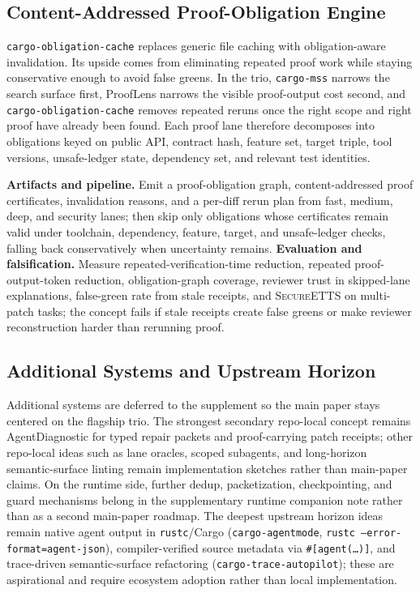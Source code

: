 \documentclass[conference]{IEEEtran}
\newcommand{\concepttag}[1]{%
  \noindent{\small\ttfamily #1}\par\vspace{2pt}%
}
\newcommand{\secureetts}{\textnormal{\textsc{SecureETTS}}}
\begin{document}
\subsection{Content-Addressed Proof-Obligation Engine}
\label{sub:obligationcache}
\concepttag{cargo-obligation-cache}
\texttt{cargo-obligation-cache} replaces generic file caching with obligation-aware invalidation. Its upside comes from eliminating repeated proof work while staying conservative enough to avoid false greens. In the trio, \texttt{cargo-mss} narrows the search surface first, ProofLens narrows the visible proof-output cost second, and \texttt{cargo-obligation-cache} removes repeated reruns once the right scope and right proof have already been found. Each proof lane therefore decomposes into obligations keyed on public API, contract hash, feature set, target triple, tool versions, unsafe-ledger state, dependency set, and relevant test identities.

\textbf{Artifacts and pipeline.} Emit a proof-obligation graph, content-addressed proof certificates, invalidation reasons, and a per-diff rerun plan from fast, medium, deep, and security lanes; then skip only obligations whose certificates remain valid under toolchain, dependency, feature, target, and unsafe-ledger checks, falling back conservatively when uncertainty remains. \textbf{Evaluation and falsification.} Measure repeated-verification-time reduction, repeated proof-output-token reduction, obligation-graph coverage, reviewer trust in skipped-lane explanations, false-green rate from stale receipts, and \secureetts{} on multi-patch tasks; the concept fails if stale receipts create false greens or make reviewer reconstruction harder than rerunning proof.

\subsection{Additional Systems and Upstream Horizon}
Additional systems are deferred to the supplement so the main paper stays centered on the flagship trio. The strongest secondary repo-local concept remains AgentDiagnostic for typed repair packets and proof-carrying patch receipts; other repo-local ideas such as lane oracles, scoped subagents, and long-horizon semantic-surface linting remain implementation sketches rather than main-paper claims. On the runtime side, further dedup, packetization, checkpointing, and guard mechanisms belong in the supplementary runtime companion note rather than as a second main-paper roadmap. The deepest upstream horizon ideas remain native agent output in \texttt{rustc}/Cargo (\texttt{cargo-agentmode}, \texttt{rustc --error-format=agent-json}), compiler-verified source metadata via \texttt{\#[agent(\ldots)]}, and trace-driven semantic-surface refactoring (\texttt{cargo-trace-autopilot}); these are aspirational and require ecosystem adoption rather than local implementation.
\end{document}
